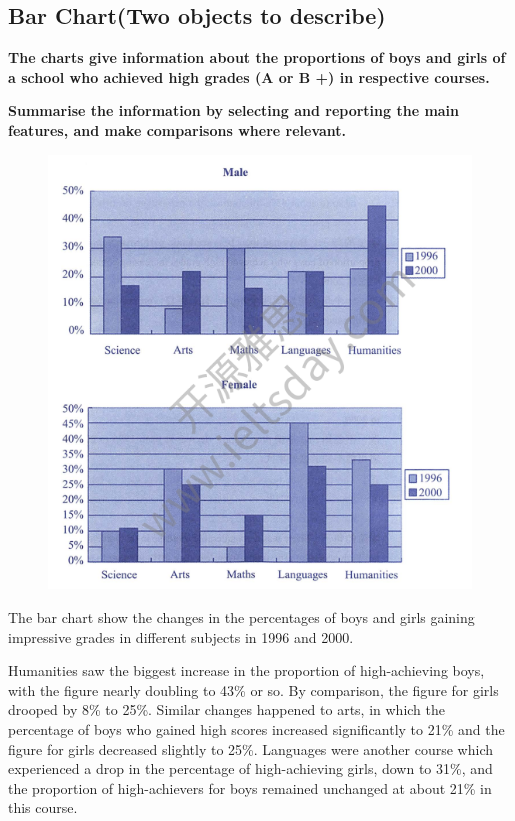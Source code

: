 \documentclass[conference]{IEEEtran}
\begin{document}
\subsection{Bar Chart(Two objects to describe)}

\textbf{The charts give information about the proportions of boys and girls of a school who
achieved high grades (A or B +) in respective courses.}

\textbf{Summarise the information by selecting and reporting the main features, and make
comparisons where relevant.}

\begin{figure}[htbp]
    \centerline{\includegraphics[width=1.1\columnwidth]{images/Screenshot from 2022-12-04 22-40-33.png}}
\end{figure}

The bar chart show the changes in the percentages of boys and girls gaining impressive grades in different subjects in 1996 and 2000.

Humanities saw the biggest increase in the proportion of high-achieving boys, with the figure nearly doubling to 43\% or so.
By comparison, the figure for girls drooped by 8\% to 25\%.
Similar changes happened to arts, in which the percentage of boys who gained high scores increased significantly to 21\% and
the figure for girls decreased slightly to 25\%.
Languages were another course which experienced a drop in the percentage of high-achieving girls, down to 31\%,
and the proportion of high-achievers for boys remained unchanged at about 21\% in this course.
\end{document}

